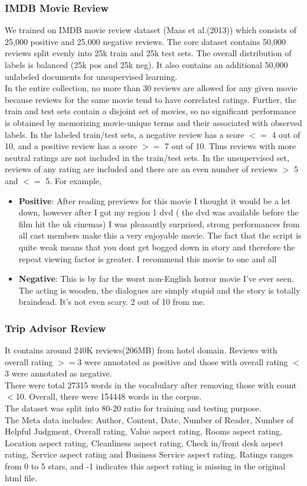 \documentclass[11pt,a4paper]{article}
\begin{document}
\subsubsection{IMDB Movie Review}
We trained on IMDB movie review dataset (Maas et al.(2013)) which consists of 25,000 positive and 25,000 negative reviews. The core dataset contains 50,000 reviews split evenly into 25k train and 25k test sets. The overall distribution of labels is balanced (25k pos and 25k neg). It also contains an additional 50,000 unlabeled documents for unsupervised learning.\\
In the entire collection, no more than 30 reviews are allowed for any given movie because reviews for the same movie tend to have correlated ratings. Further, the train and test sets contain a disjoint set of movies, so no significant performance is obtained by memorizing movie-unique terms and their associated with observed labels.  In the labeled train/test sets, a negative review has a score $<=$ 4 out of 10, and a positive review has a score $>=$ 7 out of 10. Thus reviews with more neutral ratings are not included in the train/test sets. In the unsupervised set, reviews of any rating are included and there are an even number of reviews $>$ 5 and $<=$ 5. For example,
\begin{itemize}
\item \textbf{Positive}: After reading previews for this movie I thought it would be a let down, however after I got my region 1 dvd ( the dvd was available before the film hit the uk cinemas) I was pleasantly surprised, strong performances from all cast members make this a very enjoyable movie. The fact that the script is quite weak means that you dont get bogged down in story and therefore the repeat viewing factor is greater. I recommend this movie to one and all
\item \textbf{Negative}: This is by far the worst non-English horror movie I've ever seen. The acting is wooden, the dialogues are simply stupid and the story is totally braindead. It's not even scary. 2 out of 10 from me.
\end{itemize}

\subsubsection{Trip Advisor Review}
It contains around 240K reviews(206MB) from hotel domain. Reviews with overall rating $>=$3 were annotated as positive and those with overall rating $<$3 were annotated as negative.\\
There were total 27315 words in the vocabulary after removing those with count $<$10. Overall, there were 154448 words in the corpus.\\
The dataset was split into 80-20 ratio for training and testing purpose.\\
The Meta data includes: Author, Content, Date, Number of Reader, Number of Helpful Judgment, Overall rating, Value aspect rating, Rooms aspect rating, Location aspect rating, Cleanliness aspect rating, Check in/front desk aspect rating, Service aspect rating and Business Service aspect rating. Ratings ranges from 0 to 5 stars, and -1 indicates this aspect rating is missing in the original html file.
\end{document}
